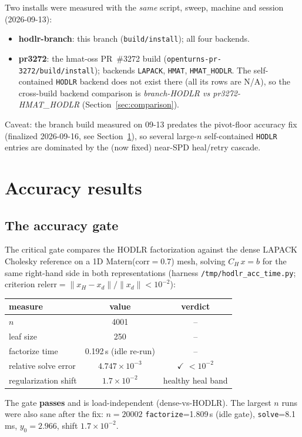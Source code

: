 \documentclass[11pt,a4paper]{article}
\newcommand{\good}{\textcolor{green!50!black}{$\checkmark$}}
\begin{document}
Two installs were measured with the \emph{same} script, sweep, machine and
session (2026-09-13):
\begin{itemize}
\item \textbf{hodlr-branch}: this branch (\texttt{build/install}); all four backends.
\item \textbf{pr3272}: the hmat-oss PR~\#3272 build
  (\texttt{openturns-pr-3272/build/install}); backends
  \texttt{LAPACK}, \texttt{HMAT}, \texttt{HMAT\_HODLR}. The self-contained
  \texttt{HODLR} backend does not exist there (all its rows are N/A), so the
  cross-build backend comparison is \emph{branch-HODLR vs pr3272-HMAT\_HODLR}
  (Section~\ref{sec:comparison}).
\end{itemize}
Caveat: the branch build measured on 09-13 predates the pivot-floor accuracy fix
(finalized 2026-09-16, see Section~\ref{sec:accuracy}), so several large-$n$
self-contained \texttt{HODLR} entries are dominated by the (now fixed)
near-SPD heal/retry cascade.

\section{Accuracy results}\label{sec:accuracy}
\subsection{The accuracy gate}
The critical gate compares the HODLR factorization against the dense LAPACK
Cholesky reference on a 1D Matern(corr$=$0.7) mesh, solving
$C_H\,x = b$ for the same right-hand side in both representations
(harness \texttt{/tmp/hodlr\_acc\_time.py}; criterion
$\mathrm{relerr} = \|x_H - x_d\|/\|x_d\| < 10^{-2}$):
\begin{center}
\begin{tabular}{lcc}
\toprule
measure & value & verdict \\
\midrule
$n$ & 4001 & --\\
leaf size & 250 & --\\
factorize time & 0.192\,s (idle re-run) \;& --\\
relative solve error & $4.747\times10^{-3}$ & \good{} $< 10^{-2}$\\
regularization shift & $1.7\times10^{-2}$ & healthy heal band\\
\bottomrule
\end{tabular}
\end{center}
The gate \textbf{passes} and is load-independent (dense-vs-HODLR). The largest
$n$ runs were also sane after the fix: $n=20002$ \texttt{factorize}=1.809\,s
(idle gate), \texttt{solve}=8.1\,ms, $y_0=2.966$, shift $1.7\times10^{-2}$.
\end{document}
